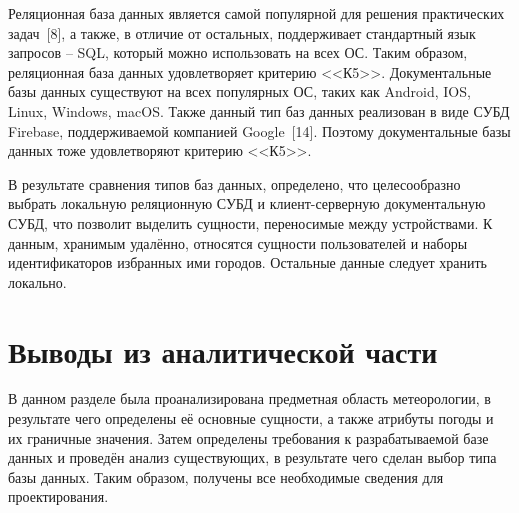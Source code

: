 Реляционная база данных является самой популярной для решения практических задач~[8], а также, в отличие от остальных, поддерживает стандартный язык запросов -- SQL, который можно использовать на всех ОС.
Таким образом, реляционная база данных удовлетворяет критерию <<К5>>.
Документальные базы данных существуют на всех популярных ОС, таких как Android, IOS, Linux, Windows, macOS.
Также данный тип баз данных реализован в виде СУБД Firebase, поддерживаемой компанией Google~[14].
Поэтому документальные базы данных тоже удовлетворяют критерию <<К5>>.

В результате сравнения типов баз данных, определено, что целесообразно выбрать локальную реляционную СУБД и клиент-серверную документальную СУБД, что позволит выделить сущности, переносимые между устройствами.
К данным, хранимым удалённо, относятся сущности пользователей и наборы идентификаторов избранных ими городов.
Остальные данные следует хранить локально.

\section*{Выводы из аналитической части}
В данном разделе была проанализирована предметная область метеорологии, в результате чего определены её основные сущности, а также атрибуты погоды и их граничные значения.
Затем определены требования к разрабатываемой базе данных и проведён анализ существующих, в результате чего сделан выбор типа базы данных.
Таким образом, получены все необходимые сведения для проектирования.